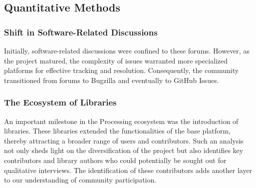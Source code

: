 

\subsection{Quantitative Methods}



\subsubsection*{Shift in Software-Related Discussions}

Initially, software-related discussions were confined to these forums. However, as the project matured, the complexity of issues warranted more specialized platforms for effective tracking and resolution. Consequently, the community transitioned from forums to Bugzilla \parencite{BugzillaArchiveProcessing} and eventually to GitHub Issues\parencite{ProcessingProcessingSource}\parencite{ProcessingProcessing4Processing}. 

\subsubsection*{The Ecosystem of Libraries}
An important milestone in the Processing ecosystem was the introduction of libraries. These libraries extended the functionalities of the base platform, thereby attracting a broader range of users and contributors. Such an analysis not only sheds light on the diversification of the project but also identifies key contributors and library authors who could potentially be sought out for qualitative interviews. The identification of these contributors adds another layer to our understanding of community participation.

\changepapersize{305.3mm:210mm}






